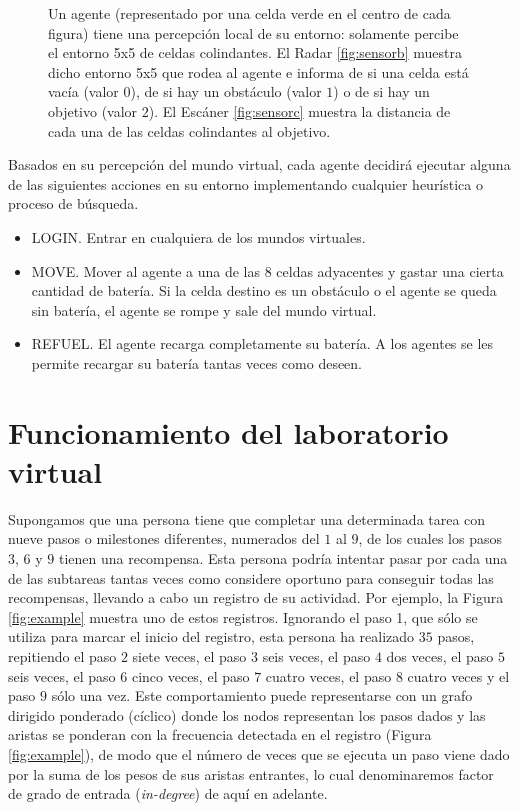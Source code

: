 \begin{figure}[H]
\begin{subfloat}[]
{
\label{fig:sensorc}
}       
\end{subfloat}
\caption{Un agente (representado por una celda verde en el centro de cada figura) tiene una percepción local de su entorno: solamente percibe el entorno 5x5 de celdas colindantes. El Radar \ref{fig:sensorb} muestra dicho entorno 5x5 que rodea al agente e informa de si una celda está vacía (valor $0$), de si hay un obstáculo (valor $1$) o de si hay un objetivo (valor $2$). El Escáner \ref{fig:sensorc} muestra la distancia de cada una de las celdas colindantes al objetivo.}
\label{fig:sensors}
\end{figure}

Basados en su percepción del mundo virtual, cada agente decidirá ejecutar alguna de las siguientes acciones en su entorno implementando cualquier heurística o proceso de búsqueda.

\begin{itemize}
	\item LOGIN. Entrar en cualquiera de los mundos virtuales.
	\item MOVE. Mover al agente a una de las $8$ celdas adyacentes y gastar una cierta cantidad de batería. Si la celda destino es un obstáculo o el agente se queda sin batería, el agente se rompe y sale del mundo  virtual.
	\item REFUEL. El agente recarga completamente su batería. A los agentes se les permite recargar su batería tantas veces como deseen.
\end{itemize}

\section{Funcionamiento del laboratorio virtual}\label{sec:funcionamiento}

Supongamos que una persona tiene que completar una determinada tarea con nueve pasos o milestones diferentes, numerados del $1$ al $9$, de los cuales los pasos $3$, $6$ y $9$ tienen una recompensa. Esta persona podría intentar pasar por cada una de las subtareas tantas veces como considere oportuno para conseguir todas las recompensas, llevando a cabo un registro de su actividad. Por ejemplo, la Figura \ref{fig:example} muestra uno de estos registros. Ignorando el paso 1, que sólo se utiliza para marcar el inicio del registro, esta persona ha realizado $35$ pasos, repitiendo el paso $2$ siete veces, el paso $3$ seis veces, el paso $4$ dos veces, el paso $5$ seis veces, el paso $6$ cinco veces, el paso $7$ cuatro veces, el paso $8$ cuatro veces y el paso $9$ sólo una vez. Este comportamiento puede representarse con un grafo dirigido ponderado (cíclico) donde los
nodos representan los pasos dados y las aristas se ponderan con la frecuencia detectada en el registro (Figura \ref{fig:example}), de modo que el número de veces que se ejecuta un paso viene dado por la suma de los pesos de sus aristas entrantes, lo cual denominaremos factor de grado de entrada (\emph{in-degree}) de aquí en adelante.

